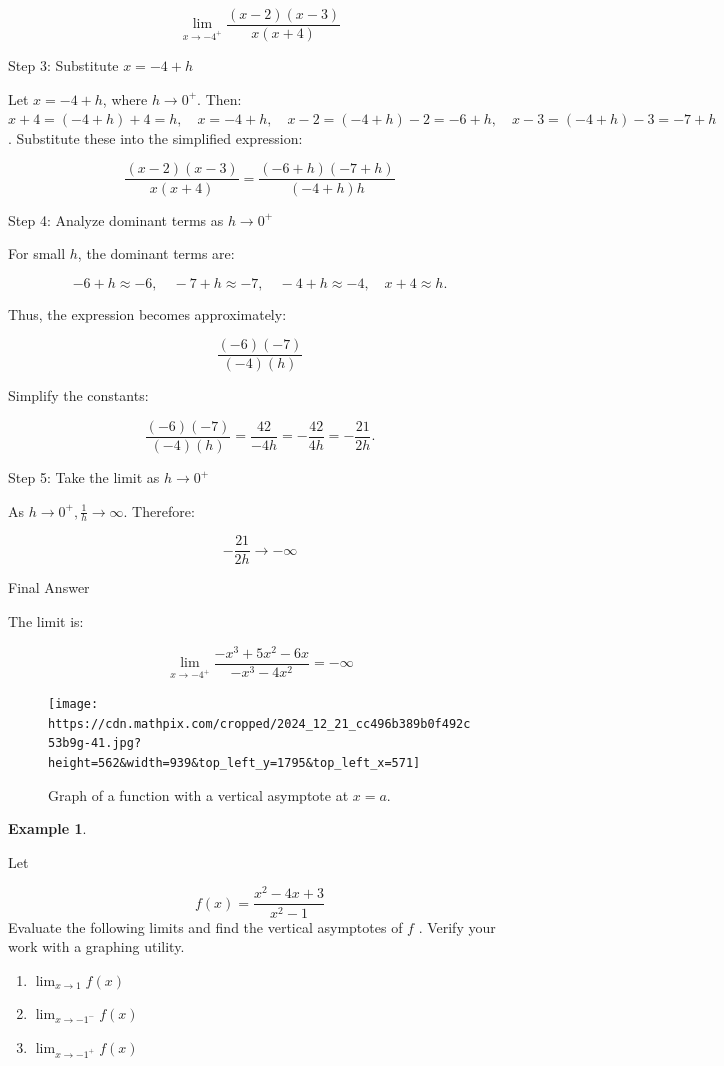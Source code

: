 \documentclass[
]{book}
\providecommand{\tightlist}{%
  \setlength{\itemsep}{0pt}\setlength{\parskip}{0pt}}
\theoremstyle{definition}
\theoremstyle{definition}
\newtheorem{example}{Example}[chapter]
\theoremstyle{definition}
\theoremstyle{definition}
\theoremstyle{remark}
\begin{document}
\[
\lim _{x \rightarrow-4^{+}} \frac{(x-2)(x-3)}{x(x+4)}
\]

Step 3: Substitute \(x=-4+h\)

Let \(x=-4+h\), where \(h \rightarrow 0^{+}\). Then:
\(x+4=(-4+h)+4=h, \quad x=-4+h, \quad x-2=(-4+h)-2=-6+h, \quad x-3=(-4+h)-3=-7+h\).
Substitute these into the simplified expression:

\[
\frac{(x-2)(x-3)}{x(x+4)}=\frac{(-6+h)(-7+h)}{(-4+h) h}
\]

Step 4: Analyze dominant terms as \(h \rightarrow 0^{+}\)

For small \(h\), the dominant terms are:

\[
-6+h \approx-6, \quad-7+h \approx-7, \quad-4+h \approx-4, \quad x+4 \approx h .
\]

Thus, the expression becomes approximately:

\[
\frac{(-6)(-7)}{(-4)(h)}
\]

Simplify the constants:

\[
\frac{(-6)(-7)}{(-4)(h)}=\frac{42}{-4 h}=-\frac{42}{4 h}=-\frac{21}{2 h} .
\]

Step 5: Take the limit as \(h \rightarrow 0^{+}\)

As \(h \rightarrow 0^{+}, \frac{1}{h} \rightarrow \infty\). Therefore:

\[
-\frac{21}{2 h} \rightarrow-\infty
\]

Final Answer

The limit is:

\[
\lim _{x \rightarrow-4^{+}} \frac{-x^{3}+5 x^{2}-6 x}{-x^{3}-4 x^{2}}=-\infty
\]

\begin{figure}
\centering
\texttt{[image: https://cdn.mathpix.com/cropped/2024\_12\_21\_cc496b389b0f492c53b9g-41.jpg?height=562\&width=939\&top\_left\_y=1795\&top\_left\_x=571]}
\caption{Graph of a function with a vertical asymptote at \(x=a\).}
\end{figure}

\begin{example}
\protect\hypertarget{exm:unnamed-chunk-44}{}\label{exm:unnamed-chunk-44}

Let

\[
f(x)=\frac{x^{2}-4 x+3}{x^{2}-1}
\]
Evaluate the following limits and find the vertical asymptotes of \(f\) . Verify your work with a graphing utility.

\begin{enumerate}
\def\labelenumi{\alph{enumi}.}
\tightlist
\item
  \(\lim _{x \rightarrow 1} f(x)\)
\item
  \(\lim _{x \rightarrow-1^{-}} f(x)\)
\item
  \(\lim _{x \rightarrow-1^{+}} f(x)\)
\end{enumerate}

\end{example}
\end{document}
